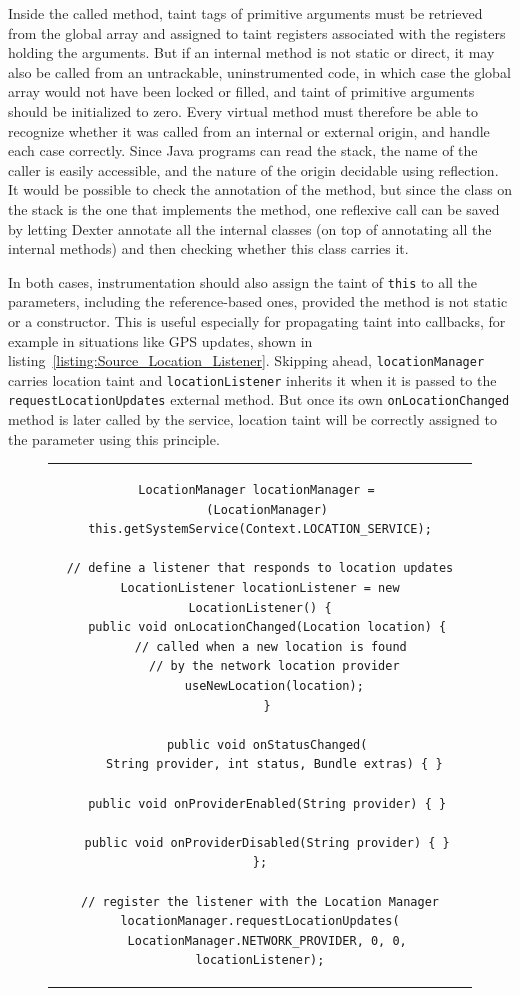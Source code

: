 \documentclass[12pt,twoside,notitlepage]{report}
\begin{document}
Inside the called method, taint tags of primitive arguments must be retrieved from the global array and assigned to taint registers associated with the registers holding the arguments. But if an internal method is not static or direct, it may also be called from an untrackable, uninstrumented code, in which case the global array would not have been locked or filled, and taint of primitive arguments should be initialized to zero. Every virtual method must therefore be able to recognize whether it was called from an internal or external origin, and handle each case correctly. Since Java programs can read the stack, the name of the caller is easily accessible, and the nature of the origin decidable using reflection. It would be possible to check the annotation of the method, but since the class on the stack is the one that implements the method, one reflexive call can be saved by letting Dexter annotate all the internal classes (on top of annotating all the internal methods) and then checking whether this class carries it.

In both cases, instrumentation should also assign the taint of \verb$this$ to all the parameters, including the reference-based ones, provided the method is not static or a constructor. This is useful especially for propagating taint into callbacks, for example in situations like GPS updates, shown in listing~\ref{listing:Source_Location_Listener}. Skipping ahead, \verb$locationManager$ carries location taint and \verb$locationListener$ inherits it when it is passed to the \verb$requestLocationUpdates$ external method. But once its own \verb$onLocationChanged$ method is later called by the service, location taint will be correctly assigned to the parameter using this principle. 

\begin{figure}
	\centering
	\begin{tabular}{c}
	\begin{lstlisting}
LocationManager locationManager = 
  (LocationManager) this.getSystemService(Context.LOCATION_SERVICE);

// define a listener that responds to location updates
LocationListener locationListener = new LocationListener() {
  public void onLocationChanged(Location location) {
    // called when a new location is found 
    // by the network location provider
    useNewLocation(location);
  }

  public void onStatusChanged(
    String provider, int status, Bundle extras) { }

  public void onProviderEnabled(String provider) { }

  public void onProviderDisabled(String provider) { }
};

// register the listener with the Location Manager
locationManager.requestLocationUpdates(
  LocationManager.NETWORK_PROVIDER, 0, 0, locationListener);
	\end{lstlisting}
	\end{tabular}
	\begin{lstlisting}[caption={Example of a location-updating callback class},
	                   label={listing:Source_Location_Listener}]
	\end{lstlisting}
\end{figure}
\end{document}
